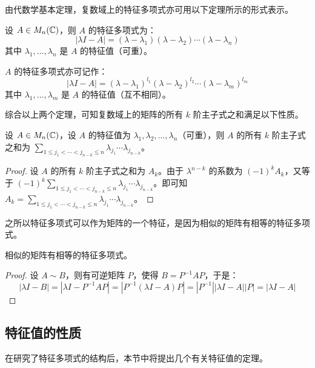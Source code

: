 由代数学基本定理，复数域上的特征多项式亦可用以下定理所示的形式表示。

\begin{theorem}
	设 $A \in M_n (\mathbb C)$，则 $A$ 的特征多项式为：
	$$
	|\lambda I - A| = (\lambda - \lambda_1) (\lambda - \lambda_2) \cdots (\lambda - \lambda_n)
	$$
	其中 $\lambda_1, \ldots, \lambda_n$ 是 $A$ 的特征值（可重）。

	$A$ 的特征多项式亦可记作：
	$$
	|\lambda I - A| = (\lambda - \lambda_1)^{l_1} (\lambda - \lambda_2)^{l_2} \cdots (\lambda - \lambda_m)^{l_m}
	$$
	其中 $\lambda_1, \ldots, \lambda_m$ 是 $A$ 的特征值（互不相同）。
\end{theorem}

综合以上两个定理，可知复数域上的矩阵的所有 $k$ 阶主子式之和满足以下性质。

\begin{theorem}
	设 $A \in M_n(\mathbb C)$，设 $A$ 的特征值为 $\lambda_1, \lambda_2, \ldots, \lambda_n$（可重），则 $A$ 的所有 $k$ 阶主子式之和为 $\sum\limits_{1 \le j_1 < \cdots < j_{n - k} \le n} \lambda_{j_1} \cdots \lambda_{j_{n - k}}$。
\end{theorem}

\begin{proof}
	设 $A$ 的所有 $k$ 阶主子式之和为 $A_k$。由于 $\lambda^{n - k}$ 的系数为 $(-1)^k A_k$，又等于 $(-1)^k \sum\limits_{1 \le j_1 < \cdots < j_{n - k} \le n} \lambda_{j_1} \cdots \lambda_{j_{n - k}}$。即可知 $A_k = \sum\limits_{1 \le j_1 < \cdots < j_{n - k} \le n} \lambda_{j_1} \cdots \lambda_{j_{n - k}}$。
\end{proof}

之所以特征多项式可以作为矩阵的一个特征，是因为相似的矩阵有相等的特征多项式。

\begin{theorem}
	相似的矩阵有相等的特征多项式。
\end{theorem}

\begin{proof}
	设 $A \sim B$，则有可逆矩阵 $P$，使得 $B = P^{-1} A P$，于是：
	$$
	|\lambda I - B| = |\lambda I - P^{-1} A P| = |P^{-1} (\lambda I - A) P| = |P^{-1}| |\lambda I - A||P| = |\lambda I - A|
	$$
\end{proof}

\subsection{特征值的性质}

在研究了特征多项式的结构后，本节中将提出几个有关特征值的定理。

